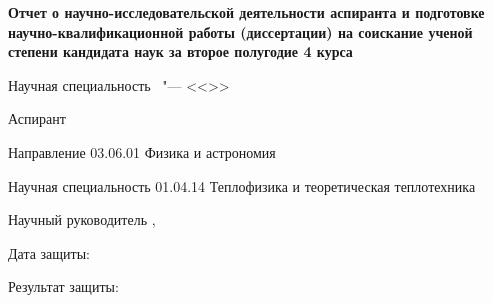 \thispagestyle{empty}
\begin{center}
\thesisOrganization
\end{center}
%
\vspace{0pt plus4fill} %
\begin{center}
\textbf {\large Отчет о научно-исследовательской деятельности аспиранта и подготовке научно-квалификационной работы
(диссертации) на соискание ученой степени кандидата наук за второе полугодие 4 курса}
\end{center}
%
\begin{center}
{\large %
\thesisTitle}

\vspace{0pt plus2fill} %
\begin{minipage}[b]{0.5\linewidth}
    \begin{flushright}
        Научная специальность \thesisSpecialtyNumber\ "---
        <<\thesisSpecialtyTitle>>
    \end{flushright}
  \end{minipage}

\vspace{0pt plus2fill} %
\end{center}


Аспирант
\hfill
\thesisAuthor

Направление
\hfill
03.06.01 Физика и астрономия

Научная специальность
\hfill
01.04.14 Теплофизика и теоретическая теплотехника

\vskip 0.2in

Научный руководитель
\hfill
{\supervisorFioShort, \supervisorRegaliaShort}

\vskip 0.2in

Дата защиты:

\vskip 0.2in

Результат защиты:

%
\vspace{0pt plus4fill} %
{\centering\thesisCity\  \thesisYear\par}
